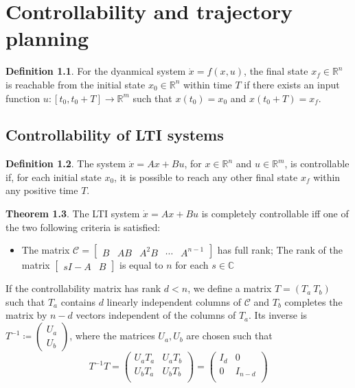 \documentclass[12pt, openany]{report}
\theoremstyle{definition}
\newtheorem{thm}{Theorem}[chapter]
\newtheorem{definition}[thm]{Definition}
\newcommand{\R}{\mathbb{R}}
\newcommand{\C}{\mathbb{C}}
\begin{document}
\chapter{Controllability and trajectory planning}\label{chap:11}
\begin{definition}
    For the dyanmical system \(\dot x=f(x,u)\), the final state \(x_f\in \R^n\) is reachable from the initial state \(x_0\in \R^n\) within time \(T\) if there exists an input function \(u:[t_0,t_0+T]\rightarrow \R^m\) such that \(x(t_0)=x_0\) and \(x(t_0+T)=x_f\).
\end{definition}
\section{Controllability of LTI systems}
\begin{definition}
    The system \(\dot x = Ax + Bu\), for \(x\in \R^n\) and \(u\in \R^m\), is controllable if, for each initial state \(x_0\), it is possible to reach any other final state \(x_f\) within any positive time \(T\).
\end{definition}
\begin{thm}
    The LTI system \(\dot x=Ax+Bu\) is completely controllable iff one of the two following criteria is satisfied:
    \begin{itemize}
        \item The matrix \(\mathcal{C}=\begin{bmatrix}
            B & AB & A^2B & \cdots & A^{n-1}
        \end{bmatrix}\) has full rank;
        The rank of the matrix \(\begin{bmatrix}
            sI-A & B
        \end{bmatrix}\) is equal to \(n\) for each \(s\in \C\)
    \end{itemize}
\end{thm}
If the controllability matrix has rank \(d<n\), we define a matrix \(T = (T_a\: T_b)\) such that \(T_a\) contains \(d\) linearly independent columns of \(\mathcal{C}\) and \(T_b\) completes the matrix by \(n-d\) vectors independent of the columns of \(T_a\). Its inverse is \(T^{-1}\coloneqq \begin{pmatrix}
    U_a \\ U_b
\end{pmatrix}\), where the matrices \(U_a,U_b\) are chosen such that 
\begin{equation}
    T^{-1}T = \begin{pmatrix}
        U_aT_a & U_aT_b \\ U_bT_a & U_bT_b\\
    \end{pmatrix} = \begin{pmatrix}
        I_d & 0 \\ 0 & I_{n-d}\\
    \end{pmatrix}
\end{equation}
\end{document}
